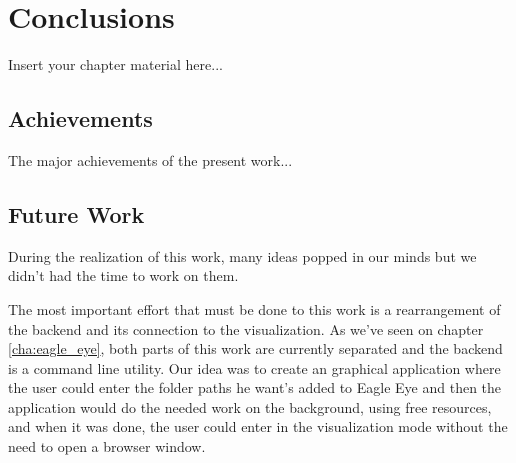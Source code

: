 
\chapter{Conclusions}
\label{chapter:conclusions}


Insert your chapter material here...


\section{Achievements}
\label{section:achievements}

The major achievements of the present work...


\section{Future Work}
\label{section:future}

During the realization of this work, many ideas popped in our minds but we didn't had the time to work on them.

The most important effort that must be done to this work is a rearrangement of the backend and its connection to the visualization. As we've seen on chapter \ref{cha:eagle_eye}, both parts of this work are currently separated and the backend is a command line utility. Our idea was to create an graphical application where the user could enter the folder paths he want's added to Eagle Eye and then the application would do the needed work on the background, using free resources, and when it was done, the user could enter in the visualization mode without the need to open a browser window.

